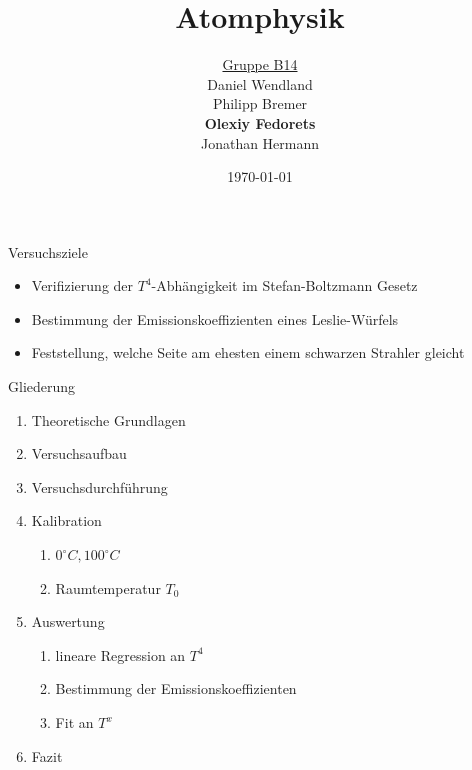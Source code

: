 \documentclass[12pt]{beamer}
\title{Atomphysik}
\author{\underline{Gruppe B14} \\ Daniel Wendland \\ Philipp Bremer \\ \textbf{Olexiy Fedorets} \\ Jonathan Hermann}
\date{\today}
\begin{document}
\begin{frame}[plain]
\titlepage
\end{frame}


\begin{frame}{Versuchsziele}
\Large
\begin{itemize}
\centering
	\item Verifizierung der $T^4$-Abhängigkeit im Stefan-Boltzmann Gesetz
	\item Bestimmung der Emissionskoeffizienten eines Leslie-Würfels
	\item Feststellung, welche Seite am ehesten einem schwarzen Strahler gleicht
\end{itemize}
\end{frame}


\begin{frame}{Gliederung}
\begin{enumerate}
	\Large
	\item{Theoretische Grundlagen}
	\item{Versuchsaufbau}
	\item{Versuchsdurchführung}
	\item{Kalibration}
		\begin{enumerate}
			\item $0^\circ C, 100^\circ C$
			\item Raumtemperatur $T_0$
		\end{enumerate}
	\item{Auswertung}
		\begin{enumerate}
			\item{lineare Regression an $T^4$}
			\item{Bestimmung der Emissionskoeffizienten}
			\item{Fit an $T^x$}
		\end{enumerate}
	\item{Fazit}
\end{enumerate}
\end{frame}
\end{document}
